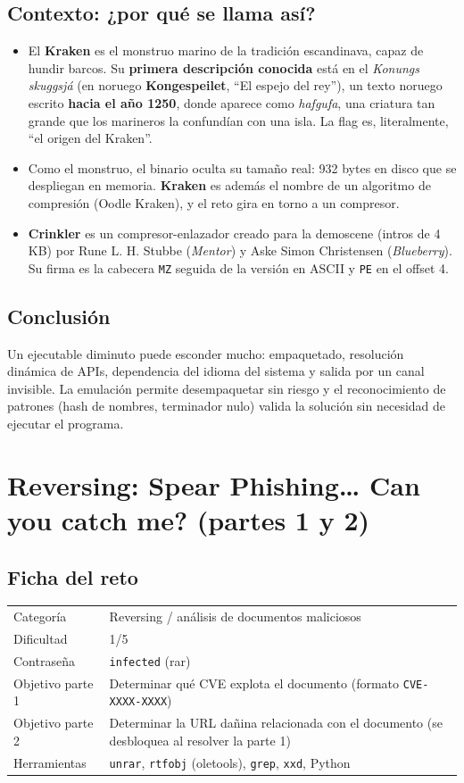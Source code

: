 \documentclass[11pt,a4paper]{article}
\begin{document}
\subsection{Contexto: ¿por qué se llama así?}
\begin{itemize}
  \item El \textbf{Kraken} es el monstruo marino de la tradición escandinava, capaz de hundir barcos. Su
        \textbf{primera descripción conocida} está en el \emph{Konungs skuggsjá} (en noruego \textbf{Kongespeilet},
        ``El espejo del rey''), un texto noruego escrito \textbf{hacia el año 1250}, donde aparece como
        \emph{hafgufa}, una criatura tan grande que los marineros la confundían con una isla. La flag es, literalmente,
        ``el origen del Kraken''.
  \item Como el monstruo, el binario oculta su tamaño real: 932 bytes en disco que se despliegan en memoria.
        \textbf{Kraken} es además el nombre de un algoritmo de compresión (Oodle Kraken), y el reto gira en torno a un
        compresor.
  \item \textbf{Crinkler} es un compresor-enlazador creado para la demoscene (intros de 4 KB) por Rune L. H. Stubbe
        (\emph{Mentor}) y Aske Simon Christensen (\emph{Blueberry}). Su firma es la cabecera \texttt{MZ} seguida de la
        versión en ASCII y \texttt{PE} en el offset 4.
\end{itemize}

\subsection{Conclusión}
Un ejecutable diminuto puede esconder mucho: empaquetado, resolución dinámica de APIs, dependencia del idioma del
sistema y salida por un canal invisible. La emulación permite desempaquetar sin riesgo y el reconocimiento de patrones
(hash de nombres, terminador nulo) valida la solución sin necesidad de ejecutar el programa.


\clearpage
\section{Reversing: Spear Phishing\dots{} Can you catch me? (partes 1 y 2)}

\subsection{Ficha del reto}
\begin{tabularx}{\linewidth}{@{}lX@{}}
\toprule
Categoría & Reversing / análisis de documentos maliciosos \\
Dificultad & 1/5 \\
Contraseña & \texttt{infected} (rar) \\
Objetivo parte 1 & Determinar qué CVE explota el documento (formato \texttt{CVE-XXXX-XXXX}) \\
Objetivo parte 2 & Determinar la URL dañina relacionada con el documento (se desbloquea al resolver la parte 1) \\
Herramientas & \texttt{unrar}, \texttt{rtfobj} (oletools), \texttt{grep}, \texttt{xxd}, Python \\
\bottomrule
\end{tabularx}
\end{document}
